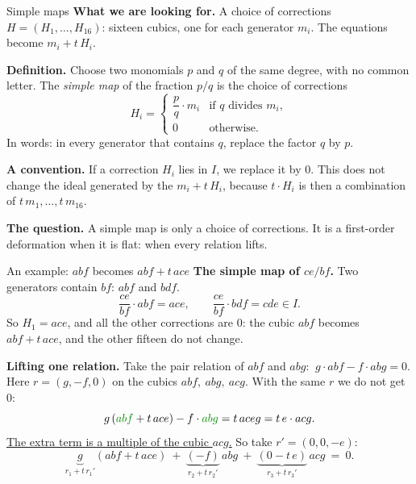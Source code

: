 \begin{frame}{Simple maps}
\textbf{What we are looking for.} A choice of corrections \(H=(H_1,\dots,H_{16})\): sixteen cubics, one for each generator \(m_i\). The equations become \(m_i+t\,H_i\).
\par\medskip
\textbf{Definition.} Choose two monomials \(p\) and \(q\) of the same degree, with no common letter. The \emph{simple map} of the fraction \(p/q\) is the choice of corrections
\[
\boxed{H_i=\begin{cases}\dfrac{p}{q}\cdot m_i&\text{if }q\text{ divides }m_i,\\[6pt]0&\text{otherwise.}\end{cases}}
\]
In words: in every generator that contains \(q\), replace the factor \(q\) by \(p\).
\par\medskip
\textbf{A convention.} If a correction \(H_i\) lies in \(I\), we replace it by \(0\). This does not change the ideal generated by the \(m_i+t\,H_i\), because \(t\cdot H_i\) is then a combination of \(t\,m_1,\dots,t\,m_{16}\).
\par\medskip
\textbf{The question.} A simple map is only a choice of corrections. It is a first-order deformation when it is flat: when every relation lifts.
\end{frame}

\begin{frame}{An example: \(abf\) becomes \(abf+t\,ace\)}
\textbf{The simple map of \(ce/bf\).} Two generators contain \(bf\): \(abf\) and \(bdf\).
\[
\frac{ce}{bf}\cdot abf=ace,\qquad\frac{ce}{bf}\cdot bdf=cde\in I.
\]
So \(H_1=ace\), and all the other corrections are \(0\): the cubic \(abf\) becomes \(abf+t\,ace\), and the other fifteen do not change.
\par\medskip
\textbf{Lifting one relation.} Take the pair relation of \(abf\) and \(abg\): \(\ g\cdot abf-f\cdot abg=0\). Here \(r=(g,-f,0)\) on the cubics \(abf,\ abg,\ acg\). With the same \(r\) we do not get \(0\):
\[
g\,({\color{green!55!black}abf}+t\,ace)-f\cdot{\color{green!55!black}abg}=t\,aceg=t\,e\cdot acg.
\]
\underline{The extra term is a multiple of the cubic \(acg\).} So take \(r'=(0,0,-e)\):
\[
\underbrace{g}_{r_1+t\,r_1'}(abf+t\,ace)\ +\ \underbrace{(-f)}_{r_2+t\,r_2'}\,abg\ +\ \underbrace{(0-t\,e)}_{r_3+t\,r_3'}\,acg\ =\ 0.
\]
\end{frame}

